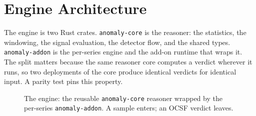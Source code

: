 \section{Engine Architecture}
\label{sec:architecture}

The engine is two Rust crates. \texttt{anomaly-core} is the reasoner: the
statistics, the windowing, the signal evaluation, the detector flow, and the
shared types. \texttt{anomaly-addon} is the per-series engine and the add-on
runtime that wraps it. The split matters because the same reasoner core computes a
verdict wherever it runs, so two deployments of the core produce identical verdicts
for identical input. A parity test pins this property.

\begin{figure}[t]
  \centering
  \caption{The engine: the reusable \texttt{anomaly-core} reasoner wrapped by the
  per-series \texttt{anomaly-addon}. A sample enters; an OCSF verdict leaves.}
  \label{fig:engine}
\end{figure}

